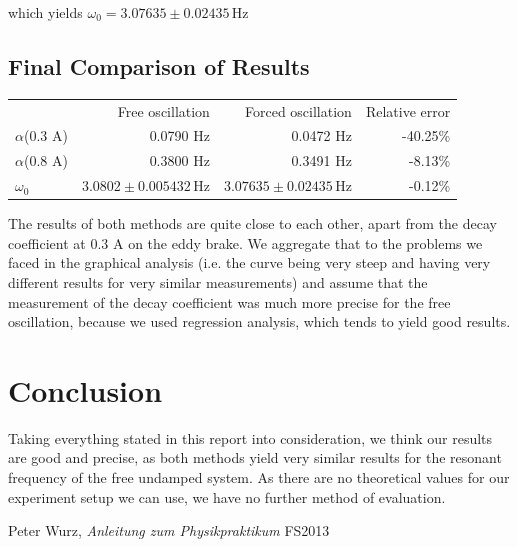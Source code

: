 \documentclass{scrreprt}
\newcommand{\unit}[1]{\ensuremath{\, \mathrm{#1}}}
\begin{document}
which yields $\omega_0 = 3.07635 \pm 0.02435 \unit{Hz}$
\subsection{Final Comparison of Results}

\begin{table}[H]
\center
\begin{tabular}{lrrr}
&Free oscillation& Forced oscillation& Relative error\\
$\alpha$(0.3 A)& 0.0790 Hz & 0.0472 Hz & -40.25\%\\
$\alpha$(0.8 A)& 0.3800 Hz & 0.3491 Hz & -8.13\%\\
$\omega_0$&$3.0802 \pm 0.005432 \unit{Hz}$&$ 3.07635 \pm 0.02435 \unit{Hz}$ & -0.12\%\\
\end{tabular}
\end{table}

The results of both methods are quite close to each other, apart from the decay coefficient at 0.3 A on the eddy brake. We aggregate that to the problems we faced in the graphical analysis (i.e. the curve being very steep and having very different results for very similar measurements) and assume that the measurement of the decay coefficient was much more precise for the free oscillation, because we used regression analysis, which tends to yield good results. 

\section{Conclusion}

Taking everything stated in this report into consideration, we think our results are good and precise, as both methods yield very similar results for the resonant frequency of the free undamped system. As there are no theoretical values for our experiment setup we can use, we have no further method of evaluation.


\begin{thebibliography}{9}

  Peter Wurz,
  \emph{Anleitung zum Physikpraktikum}
  FS2013

\end{thebibliography}
\end{document}
